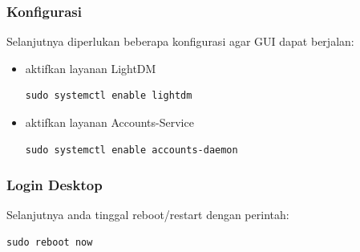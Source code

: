 \documentclass[12pt,]{article}
\begin{document}
	\subsubsection{Konfigurasi}
	Selanjutnya diperlukan beberapa konfigurasi agar GUI dapat berjalan:
	\begin{itemize}
		\item aktifkan layanan LightDM
		\begin{verbatim}
sudo systemctl enable lightdm
		\end{verbatim}

		\item aktifkan layanan Accounts-Service
		\begin{verbatim}
sudo systemctl enable accounts-daemon
		\end{verbatim}
	\end{itemize}

	\subsubsection{Login Desktop}
	Selanjutnya anda tinggal reboot/restart dengan perintah:
	\begin{verbatim}
sudo reboot now
	\end{verbatim}
\end{document}
